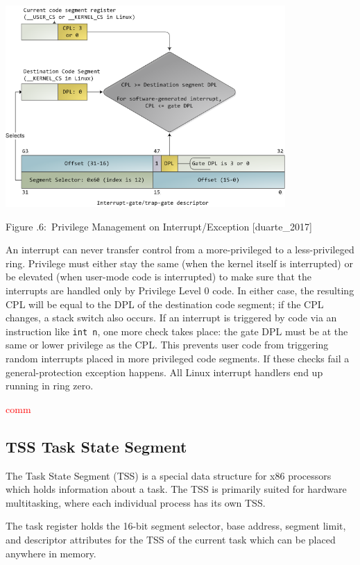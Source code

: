 \documentclass[twoside]{article}
\newcounter{lecnum}
\renewcommand{\cite}[1]{[#1]}
\newcommand{\fig}[3]{
            \vspace{#2}
            \begin{center}
            Figure \thelecnum.#1:~#3
            \end{center}
    }
\begin{document}
\begin{center}
  \includegraphics[width=0.8\textwidth]{intdescprv.png}
  \fig{6}{0 pt}{Privilege Management on Interrupt/Exception \cite{duarte_2017}}
\end{center}

An interrupt can never transfer control from a more-privileged to a less-privileged ring. Privilege must either stay the same (when the kernel itself is interrupted) or be elevated (when user-mode code is interrupted) to make sure that the interrupts are handled only by Privilege Level 0 code. In either case, the resulting CPL will be equal to the DPL of the destination code segment; if the CPL changes, a stack switch also occurs. If an interrupt is triggered by code via an instruction like \texttt{int n}, one more check takes place: the gate DPL must be at the same or lower privilege as the CPL. This prevents user code from triggering random interrupts placed in more privileged code segments. If these checks fail a general-protection exception happens. All Linux interrupt handlers end up running in ring zero. 

\textcolor{red}{comm} 


\subsection{TSS Task State Segment}
The Task State Segment (TSS) is a special data structure for x86 processors which holds information about a task. The TSS is primarily suited for hardware multitasking, where each individual process has its own TSS.

The task register holds the 16-bit segment selector, base address, segment limit, and descriptor attributes for the TSS of the current task which can be placed anywhere in memory.
\end{document}
